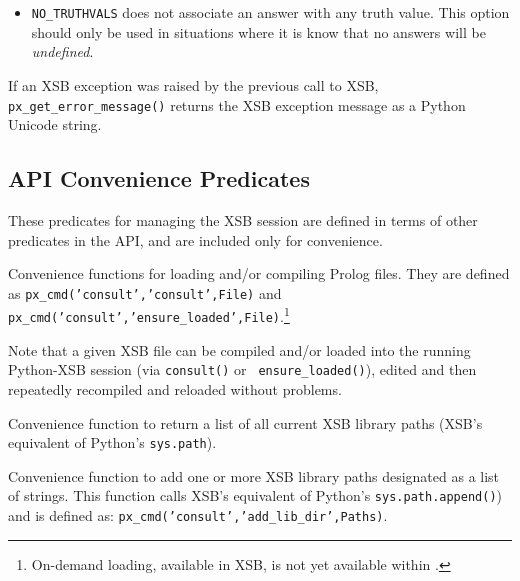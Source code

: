 \begin{description}
\begin{itemize}
      \item {\tt NO\_TRUTHVALS} does not associate an answer with any
        truth value.  This option should only be used in situations
        where it is know that no answers will be {\em undefined}.
        \ei
  \end{itemize}

  If an XSB exception was raised by the previous call to XSB, {\tt
    px\_get\_error\_message()} returns the XSB exception message as a
  Python Unicode string.
  
  
\end{description}

\subsection{\px{} API Convenience Predicates}

These predicates for managing the XSB session are defined in terms of
other predicates in the \px{} API, and are included only for
convenience.

\begin{description}

%
  Convenience functions for loading and/or compiling Prolog files.
  They are defined as {\tt px\_cmd('consult','consult',File)} and {\tt
    px\_cmd('consult','ensure\_loaded',File)}.\footnote{On-demand
    loading, available in XSB, is not yet available within \px{}.}

  Note that a given XSB file can be compiled and/or loaded into the
  running Python-XSB session (via {\tt consult()} or {\tt
    ensure\_loaded()}), edited and then repeatedly recompiled and
    reloaded without problems.

%  
  Convenience function to return a list of all current XSB library
  paths (XSB's equivalent of Python's {\tt sys.path}).

%  
    Convenience function to add one or more XSB library paths
    designated as a list of strings.  This function calls XSB's
    equivalent of Python's {\tt sys.path.append()}) and is defined as:
    {\tt px\_cmd('consult','add\_lib\_dir',Paths)}.
  
\end{description}

